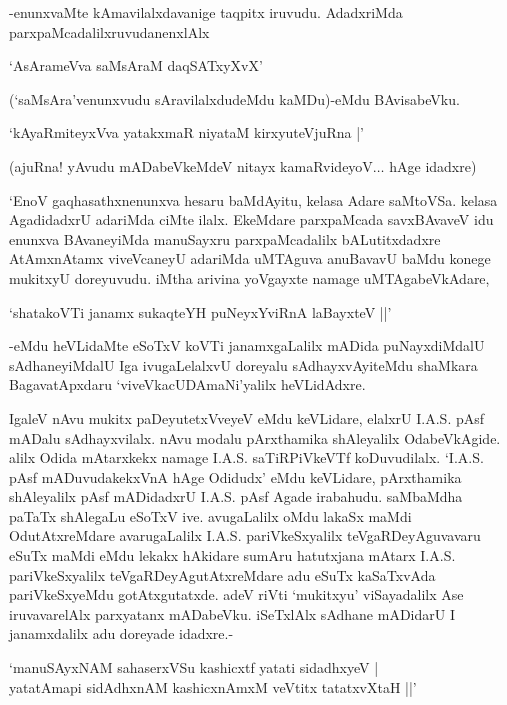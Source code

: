 -enunxvaMte kAmavilalxdavanige taqpitx iruvudu. AdadxriMda parxpaMcadalilxruvudanenxlAlx

\begin{shloka}
`AsArameVva saMsAraM daqSATxyXvX'
\end{shloka}

(`saMsAra'venunxvudu sAravilalxdudeMdu kaMDu)-eMdu BAvisabeVku.

\begin{shloka}
`kAyaRmiteyxVva yatakxmaR niyataM kirxyuteV\s juRna |'
\end{shloka}

(ajuRna! yAvudu mADabeVkeMdeV nitayx kamaRvideyoV$\ldots$ hAge idadxre)

`EnoV gaqhasathxnenunxva hesaru baMdAyitu, kelasa Adare saMtoVSa. kelasa AgadidadxrU adariMda ciMte ilalx. EkeMdare parxpaMcada savxBAvaveV idu enunxva BAvaneyiMda manuSayxru parxpaMcadalilx bALutitxdadxre AtAmxnAtamx viveVcaneyU adariMda uMTAguva anuBavavU baMdu konege mukitxyU doreyuvudu. iMtha arivina yoVgayxte namage uMTAgabeVkAdare,

\begin{shloka}
`shatakoVTi janamx sukaqteYH puNeyxYviRnA laBayxteV ||'
\end{shloka}

-eMdu heVLidaMte eSoTxV koVTi janamxgaLalilx mADida puNayxdiMdalU sAdhaneyiMdalU Iga ivugaLelalxvU doreyalu sAdhayxvAyiteMdu shaMkara BagavatApxdaru `viveVkacUDAmaNi'yalilx heVLidAdxre.

IgaleV nAvu mukitx paDeyutetxVveyeV eMdu keVLidare, elalxrU {\eng I.A.S.} pAsf mADalu sAdhayxvilalx. nAvu modalu pArxthamika shAleyalilx OdabeVkAgide. alilx Odida mAtarxkekx namage {\eng I.A.S.} saTiRPiVkeVTf koDuvudilalx. `{\eng I.A.S.} pAsf mADuvudakekxVnA hAge Odidudx' eMdu keVLidare, pArxthamika shAleyalilx pAsf mADidadxrU {\eng I.A.S.} pAsf Agade irabahudu. saMbaMdha paTaTx shAlegaLu eSoTxV ive. avugaLalilx oMdu lakaSx maMdi OdutAtxreMdare avarugaLalilx {\eng I.A.S.} pariVkeSxyalilx teVgaRDeyAguvavaru eSuTx maMdi eMdu lekakx hAkidare sumAru hatutxjana mAtarx {\eng I.A.S.} pariVkeSxyalilx teVgaRDeyAgutAtxreMdare adu eSuTx kaSaTxvAda pariVkeSxyeMdu gotAtxgutatxde. adeV riVti `mukitxyu' viSayadalilx Ase iruvavarelAlx parxyatanx mADabeVku. iSeTxlAlx sAdhane mADidarU I janamxdalilx adu doreyade idadxre.-

\begin{shloka}
`manuSAyxNAM sahaserxVSu kashicxtf yatati sidadhxyeV |\\
yatatAmapi sidAdhxnAM kashicxnAmxM veVtitx tatatxvXtaH ||'
\end{shloka}

